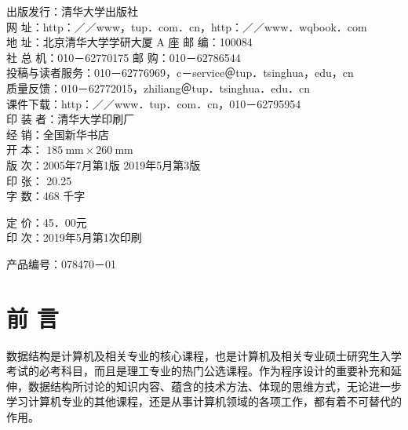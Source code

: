 \documentclass[10pt]{article}
\begin{document}
出版发行：清华大学出版社\\
网 址：http：／／www，tup．com．cn，http：／／www．wqbook．com\\
地 址：北京清华大学学研大厦 A 座 邮 编：100084\\
社 总 机：010－62770175 邮 购：010－62786544\\
投稿与读者服务：010－62776969，c－service＠tup．tsinghua，edu，cn\\
质量反馈：010－62772015，zhiliang＠tup．tsinghua．edu．cn\\
课件下载：http：／／www．tup．com．cn，010－62795954\\
印 装 者：清华大学印刷厂\\
经 销：全国新华书店\\
开 本： $185 \mathrm{~mm} \times 260 \mathrm{~mm}$\\
版 次：2005年7月第1版 2019年5月第3版\\
印 张： 20.25\\
字 数：468 千字

定 价：45．00元\\
印 次：2019年5月第1次印刷

产品编号：078470－01

\section*{前 言}
数据结构是计算机及相关专业的核心课程，也是计算机及相关专业硕士研究生入学考试的必考科目，而且是理工专业的热门公选课程。作为程序设计的重要补充和延伸，数据结构所讨论的知识内容、蕴含的技术方法、体现的思维方式，无论进一步学习计算机专业的其他课程，还是从事计算机领域的各项工作，都有着不可替代的作用。
\end{document}
